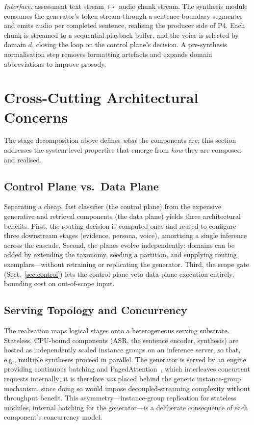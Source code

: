 \documentclass[runningheads]{llncs}
\begin{document}
\emph{Interface:} assessment text stream $\mapsto$ audio chunk stream.
The synthesis module consumes the generator's token stream through a sentence-boundary segmenter and emits audio per completed sentence, realising the producer side of P4. Each chunk is streamed to a sequential playback buffer, and the voice is selected by domain $d$, closing the loop on the control plane's decision. A pre-synthesis normalisation step removes formatting artefacts and expands domain abbreviations to improve prosody.

\section{Cross-Cutting Architectural Concerns}
\label{sec:concerns}

The stage decomposition above defines \emph{what} the components are; this section addresses the system-level properties that emerge from \emph{how} they are composed and realised.

\subsection{Control Plane vs.\ Data Plane}

Separating a cheap, fast classifier (the control plane) from the expensive generative and retrieval components (the data plane) yields three architectural benefits. First, the routing decision is computed once and reused to configure three downstream stages (evidence, persona, voice), amortising a single inference across the cascade. Second, the planes evolve independently: domains can be added by extending the taxonomy, seeding a partition, and supplying routing exemplars---without retraining or replicating the generator. Third, the scope gate (Sect.~\ref{sec:control}) lets the control plane veto data-plane execution entirely, bounding cost on out-of-scope input.

\subsection{Serving Topology and Concurrency}

The realisation maps logical stages onto a heterogeneous serving substrate. Stateless, CPU-bound components (ASR, the sentence encoder, synthesis) are hosted as independently scaled instance groups on an inference server, so that, e.g., multiple syntheses proceed in parallel. The generator is served by an engine providing continuous batching and PagedAttention~\cite{kwon2023}, which interleaves concurrent requests internally; it is therefore \emph{not} placed behind the generic instance-group mechanism, since doing so would impose decoupled-streaming complexity without throughput benefit. This asymmetry---instance-group replication for stateless modules, internal batching for the generator---is a deliberate consequence of each component's concurrency model.
\end{document}
